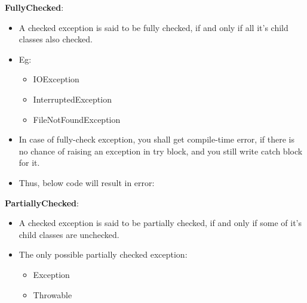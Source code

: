 \setlength{\columnsep}{3pt}
\begin{flushleft}
	
		\textbf{FullyChecked}:
		\begin{itemize}
			\item A checked exception is said to be fully checked, if and only if all it’s child classes also checked.
			\item Eg: 
			\begin{itemize}
				\item IOException
				\item InterruptedException
				\item FileNotFoundException
			\end{itemize}
			
			\item In case of fully-check exception, you shall get compile-time error, if there is no chance of raising an exception in try block, and you still write catch block for it.
			\item Thus, below code will result in error:
			\bigskip
			\bigskip
		\end{itemize}
		
		\newpage
		\textbf{PartiallyChecked}:
		\begin{itemize}
			\item A checked exception is said to be partially checked, if and only if some of it’s child classes are unchecked.
			\item The only possible partially checked exception:
			\begin{itemize}
				\item Exception
				\item Throwable
			\end{itemize}
		

\end{itemize}
\end{flushleft}
